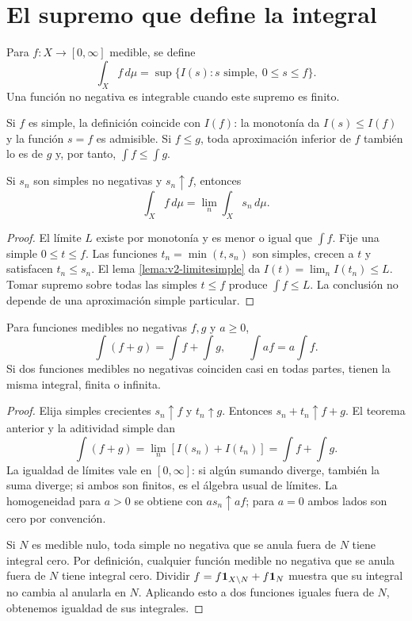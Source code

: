 \section{El supremo que define la integral}
\begin{definicion}
Para $f:X\to[0,\infty]$ medible, se define
\[\int_Xf\,d\mu=\sup\{I(s):s\text{ simple},\ 0\le s\le f\}.\]
Una función no negativa es integrable cuando este supremo es finito.
\end{definicion}
Si $f$ es simple, la definición coincide con $I(f)$: la monotonía da $I(s)\le I(f)$ y la función $s=f$ es admisible. Si $f\le g$, toda aproximación inferior de $f$ también lo es de $g$ y, por tanto, $\int f\le\int g$.

\begin{teorema}\label{teo:v2-integral-aprox}
Si $s_n$ son simples no negativas y $s_n\uparrow f$, entonces
\[\int_Xf\,d\mu=\lim_n\int_Xs_n\,d\mu.\]
\end{teorema}
\begin{proof}
El límite $L$ existe por monotonía y es menor o igual que $\int f$. Fije una simple $0\le t\le f$. Las funciones $t_n=\min(t,s_n)$ son simples, crecen a $t$ y satisfacen $t_n\le s_n$. El lema \ref{lema:v2-limitesimple} da $I(t)=\lim_nI(t_n)\le L$. Tomar supremo sobre todas las simples $t\le f$ produce $\int f\le L$. La conclusión no depende de una aproximación simple particular.
\end{proof}
\begin{proposicion}\label{prop:v2-integral-positiva}
Para funciones medibles no negativas $f,g$ y $a\ge0$,
\[\int(f+g)=\int f+\int g,\qquad \int af=a\int f.\]
Si dos funciones medibles no negativas coinciden casi en todas partes, tienen la misma integral, finita o infinita.
\end{proposicion}
\begin{proof}
Elija simples crecientes $s_n\uparrow f$ y $t_n\uparrow g$. Entonces $s_n+t_n\uparrow f+g$. El teorema anterior y la aditividad simple dan
\[\int(f+g)=\lim_n[I(s_n)+I(t_n)]=\int f+\int g.\]
La igualdad de límites vale en $[0,\infty]$: si algún sumando diverge, también la suma diverge; si ambos son finitos, es el álgebra usual de límites. La homogeneidad para $a>0$ se obtiene con $as_n\uparrow af$; para $a=0$ ambos lados son cero por convención.

Si $N$ es medible nulo, toda simple no negativa que se anula fuera de $N$ tiene integral cero. Por definición, cualquier función medible no negativa que se anula fuera de $N$ tiene integral cero. Dividir $f=f\mathbf1_{X\setminus N}+f\mathbf1_{N}$ muestra que su integral no cambia al anularla en $N$. Aplicando esto a dos funciones iguales fuera de $N$, obtenemos igualdad de sus integrales.
\end{proof}

